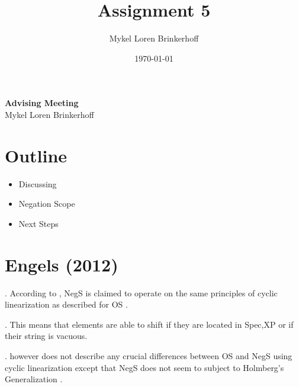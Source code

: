 \documentclass[12pt, letterpaper]{article}
\title{Assignment 5}
\author{Mykel Loren Brinkerhoff}
\date{\today}
\begin{document}
	
	\setlength{\Extopsep}{6pt}
	\setlength{\Exlabelsep}{9pt}		%
	
	
\begin{center}
	{\Large \textbf{Advising Meeting }}\\
	\vspace{6pt}
	Mykel Loren Brinkerhoff
\end{center}
\thispagestyle{fancy}

\section{Outline}

\begin{itemize}
	\item Discussing \citet{engelsScandinavianNegativeIndefinites2012}
	\item Negation Scope
	\item Next Steps
\end{itemize}

\section{Engels (2012)}

\ex. According to \citet{engelsScandinavianNegativeIndefinites2012}, NegS is claimed to operate on the same principles of cyclic linearization as described for OS \citet{foxCyclicLinearizationSyntactic2005}.

\ex. This means that elements are able to shift if they are located in Spec,XP or if their string is vacuous. 

\ex. \citeauthor{engelsScandinavianNegativeIndefinites2012} however does not describe any crucial differences between OS and NegS using cyclic linearization except that NegS does not seem to subject to Holmberg's Generalization \citep{holmbergWordOrderSyntactic1986, holmbergRemarksHolmbergGeneralization1999}.
\end{document}
